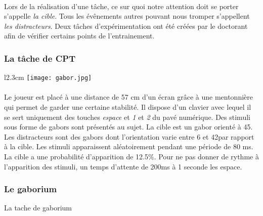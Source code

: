 \paragraph{}Lors de la réalisation d'une tâche, ce sur quoi notre attention doit se porter s'appelle \emph{la cible}. Tous les évênements autres pouvant nous tromper s'appellent
\emph{les distracteurs}. Deux tâches d'expérimentation ont été créées par le doctorant  afin de vérifier certains points de l'entrainement.


\subsubsection{La tâche de CPT}

\begin{wrapfigure}[5]{l}{2.3cm}
\vspace{-15pt}
\texttt{[image: gabor.jpg]}
\end{wrapfigure}

\paragraph{}Le joueur est placé à une distance de 57 cm d'un écran grâce à une mentonnière qui permet de garder une certaine stabilité. Il dispose d'un clavier avec lequel il se sert
uniquement des touches \emph{espace} et \emph{1} et \emph{2} du pavé numérique. Des stimuli sous forme de \glspl{gabor} sont présentés au sujet. La cible est un gabor orienté à
45\degre. Les distracteurs sont des gabors dont l'orientation varie entre 6 et 42\degre par rapport à la cible. Les stimuli apparaissent aléatoirement pendant une période de 80 ms. La
cible a une probabilité d'apparition de 12.5\%. Pour ne pas donner de rythme à l'apparition des stimuli, un temps d'attente de 200ms à 1 seconde les espace.



\subsubsection{Le gaborium}

La tache de gaborium



\newpage